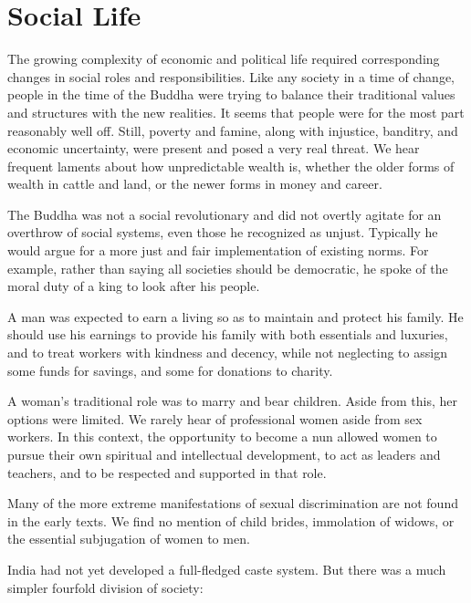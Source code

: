 \documentclass[12pt,openany]{book}%
\begin{document}
\section*{Social Life}

The growing complexity of economic and political life required corresponding changes in social roles and responsibilities. Like any society in a time of change, people in the time of the Buddha were trying to balance their traditional values and structures with the new realities. It seems that people were for the most part reasonably well off. Still, poverty and famine, along with injustice, banditry, and economic uncertainty, were present and posed a very real threat. We hear frequent laments about how unpredictable wealth is, whether the older forms of wealth in cattle and land, or the newer forms in money and career.

The Buddha was not a social revolutionary and did not overtly agitate for an overthrow of social systems, even those he recognized as unjust. Typically he would argue for a more just and fair implementation of existing norms. For example, rather than saying all societies should be democratic, he spoke of the moral duty of a king to look after his people.

A man was expected to earn a living so as to maintain and protect his family. He should use his earnings to provide his family with both essentials and luxuries, and to treat workers with kindness and decency, while not neglecting to assign some funds for savings, and some for donations to charity.

A woman’s traditional role was to marry and bear children. Aside from this, her options were limited. We rarely hear of professional women aside from sex workers. In this context, the opportunity to become a nun allowed women to pursue their own spiritual and intellectual development, to act as leaders and teachers, and to be respected and supported in that role.

Many of the more extreme manifestations of sexual discrimination are not found in the early texts. We find no mention of child brides, immolation of widows, or the essential subjugation of women to men.

India had not yet developed a full-fledged caste system. But there was a much simpler fourfold division of society:
\end{document}
